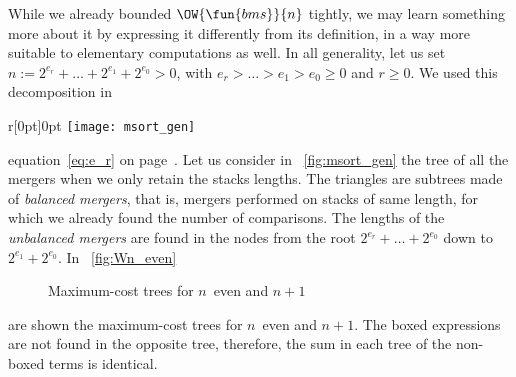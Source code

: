 While we already bounded \(\OW{\fun{bms}}{n}\) tightly, we may learn
something more about it by expressing it differently from its
definition, in a way more suitable to elementary computations as well.
In all generality, let us set \(n := 2^{e_r} + \dots + 2^{e_1} +
2^{e_0} > 0\), with \(e_r > \dots > e_1 > e_0 \geqslant 0\) and \(r
\geqslant 0\).  We used this decomposition in
\begin{wrapfigure}[9]{r}[0pt]{0pt}
\centering
\texttt{[image: msort\_gen]} %
\caption{\(\sum_{j=0}^{r}2^{e_j}\) keys}
\label{fig:msort_gen}
\end{wrapfigure}
equation~\eqref{eq:e_r} on page~\pageref{eq:e_r}. Let us consider in
\fig~\ref{fig:msort_gen} the tree of all
the mergers when we only retain the stacks lengths. The triangles are
subtrees made of \emph{balanced mergers}, that is, mergers performed
on stacks of same length, for which we already found the number of
comparisons. The lengths of the \emph{unbalanced mergers} are found in
the nodes from the root \(2^{e_r}+ \dots + 2^{e_0}\) down to \(2^{e_1}
+ 2^{e_0}\). In \fig~\vref{fig:Wn_even}
\begin{figure}
\centering
{}
\qquad
{}
\caption{Maximum-cost trees for \(n\)~even and \(n+1\)}
\label{fig:Wn_even}
\end{figure}
are shown the maximum\hyp{}cost trees for \(n\)~even and \(n+1\). The
boxed expressions are not found in the opposite tree, therefore, the
sum in each tree of the non\hyp{}boxed terms is identical.
